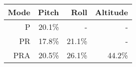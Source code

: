 \begin{tabular}{*{4}{r}}
    \toprule
    Mode & Pitch  & Roll   & Altitude \\
    \midrule
    P    & 20.1\% & -      & -        \\
    PR   & 17.8\% & 21.1\% & -        \\
    PRA  & 20.5\% & 26.1\% & 44.2\%   \\
    \bottomrule
\end{tabular}
